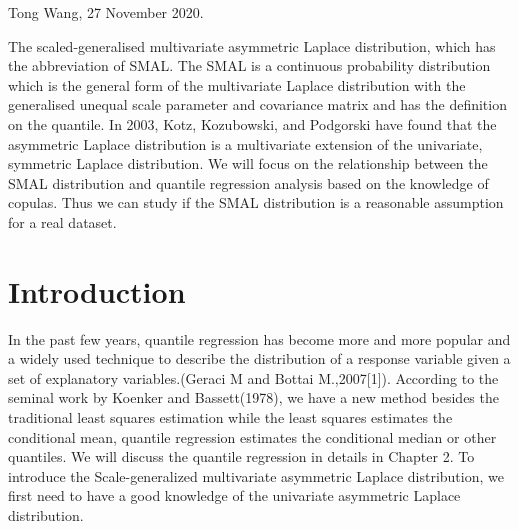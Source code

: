 \documentclass[mstat,12pt]{unswthesis}  %
\newcommand\blankpage{%
    \null
    \thispagestyle{empty}%
    \addtocounter{page}{-1}%
    \newpage}
\numberwithin{equation}{section}
\begin{document}
{\bigskip\bigskip\bigskip\noindent} Tong Wang, 27 November 2020.

\afterpage{\blankpage}



The scaled-generalised multivariate asymmetric Laplace distribution, which has the abbreviation of SMAL. The SMAL is a continuous probability distribution which is the general form of the multivariate Laplace distribution with the generalised unequal scale parameter and covariance matrix and has the definition on the quantile. In 2003, Kotz, Kozubowski, and Podgorski have found that the asymmetric Laplace distribution is a multivariate extension of the univariate, symmetric Laplace distribution. We will focus on the relationship between the SMAL distribution and quantile regression analysis based on the knowledge of copulas. Thus we can study if the SMAL distribution is a reasonable assumption for a real dataset.


\afterpage{\blankpage}


\afterpreface





%
%




\afterpage{\blankpage}

\chapter{Introduction}\label{s-intro}
In the past few years, quantile regression has become more and more popular and a widely used technique to describe the distribution of a response variable given a set of explanatory variables.(Geraci M and Bottai M.,2007[1]). According to the seminal work by Koenker and Bassett(1978), we have a new method besides the traditional least squares estimation while the least squares estimates the conditional mean, quantile regression estimates the conditional median or other quantiles. We will discuss the quantile regression in details in Chapter 2. To introduce the Scale-generalized multivariate asymmetric Laplace distribution, we first need to have a good knowledge of the univariate asymmetric Laplace distribution. 
\end{document}
